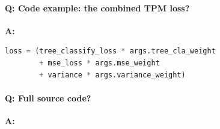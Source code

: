 \documentclass[11pt]{article}
\begin{document}
\paragraph{Q: Code example: the combined TPM loss?}
\textbf{A:}
\begin{lstlisting}[language=Python]
loss = (tree_classify_loss * args.tree_cla_weight
        + mse_loss * args.mse_weight
        + variance * args.variance_weight)
\end{lstlisting}

\paragraph{Q: Full source code?}
\textbf{A:}

\end{document}
